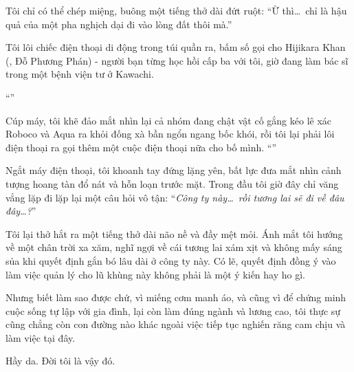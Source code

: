 \documentclass[../main.tex]{subfiles}
\begin{document}
Tôi chỉ có thể chép miệng, buông một tiếng thở dài đứt ruột: ``Ừ thì\dots\ chỉ là hậu quả của một pha nghịch dại đi vào lòng đất thôi mà.''

Tôi lôi chiếc điện thoại di động trong túi quần ra, bấm số gọi cho Hijikara Khan (, Đỗ Phương Phán) - người bạn từng học hồi cấp ba với tôi, giờ đang làm bác sĩ trong một bệnh viện tư ở Kawachi.

``''

Cúp máy, tôi khẽ đảo mắt nhìn lại cả nhóm đang chật vật cố gắng kéo lê xác Roboco và Aqua ra khỏi đống xà bần ngổn ngang bốc khói, rồi tôi lại phải lôi điện thoại ra gọi thêm một cuộc điện thoại nữa cho bố mình. ``''

Ngắt máy điện thoại, tôi khoanh tay đứng lặng yên, bất lực đưa mắt nhìn cảnh tượng hoang tàn đổ nát và hỗn loạn trước mặt. Trong đầu tôi giờ đây chỉ văng vẳng lặp đi lặp lại một câu hỏi vô tận: ``\textit{Công ty này\dots\ rồi tương lai sẽ đi về đâu đây\dots?}''

Tôi lại thở hắt ra một tiếng thở dài não nề và đầy mệt mỏi. Ánh mắt tôi hướng về một chân trời xa xăm, nghĩ ngợi về cái tương lai xám xịt và không mấy sáng sủa khi quyết định gắn bó lâu dài ở công ty này. Có lẽ, quyết định đồng ý vào làm việc quản lý cho lũ khùng này không phải là một ý kiến hay ho gì.

Nhưng biết làm sao được chứ, vì miếng cơm manh áo, và cũng vì để chứng minh cuộc sống tự lập với gia đình, lại còn làm đúng ngành và lương cao, tôi thực sự cũng chẳng còn con đường nào khác ngoài việc tiếp tục nghiến răng cam chịu và làm việc tại đây.

Hầy da. Đời tôi là vậy đó.
\end{document}

